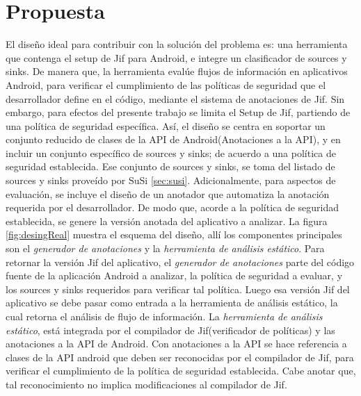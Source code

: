 \section{Propuesta}

El diseño ideal para contribuir con la solución del problema es: una herramienta
que contenga el setup de Jif para Android, e integre un clasificador de
sources y sinks. De manera que, la herramienta evalúe flujos de información en
aplicativos Android, para verificar el cumplimiento de las políticas de
seguridad que el desarrollador define en el código, mediante el sistema de
anotaciones de Jif.\newline
Sin embargo, para efectos del presente trabajo se limita el Setup de Jif,
partiendo de una política de seguridad específica. Así, el diseño se centra en
soportar un conjunto reducido de clases de la API de Android(Anotaciones a la
API), y en incluir un conjunto específico de sources y sinks; de acuerdo a una
política de seguridad establecida. Ese conjunto de sources y sinks, se toma del
listado de sources y sinks proveído por SuSi \ref{sec:susi}.\newline 
Adicionalmente, para aspectos de evaluación, se incluye el diseño de un
anotador que automatiza la anotación requerida por el desarrollador.
De modo que, acorde a la política de seguridad establecida, se genere la
versión anotada del aplicativo a analizar.\newline
La figura \ref{fig:desingReal} muestra el esquema del diseño, allí los componentes
principales son el \emph{generador de anotaciones} y la \emph{herramienta de
análisis estático}.\newline 
Para retornar la versión Jif del aplicativo, el \emph{generador de anotaciones}
parte del código fuente de la aplicación Android a analizar, la política de
seguridad a evaluar, y los sources y sinks requeridos para verificar tal
política.\newline 
Luego esa versión Jif del aplicativo se debe pasar como entrada a la herramienta
de análisis estático, la cual retorna el análisis de flujo de
información.\newline 
La \emph{herramienta de análisis estático}, está integrada
por el compilador de Jif(verificador de políticas) y las anotaciones a la API de Android. Con
anotaciones a la API se hace referencia a clases de la API android que deben ser
reconocidas por el compilador de Jif, para verificar el cumplimiento de la
política de seguridad establecida. Cabe anotar que, tal reconocimiento no
implica modificaciones al compilador de Jif.

